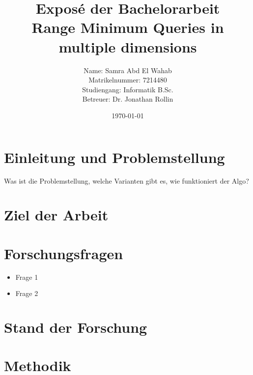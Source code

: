 \documentclass{article}
\title{%
    Exposé der Bachelorarbeit\\[1em]
    \large Range Minimum Queries in multiple dimensions
}
\author{%
    Name: Samra Abd El Wahab\\
    Matrikelnummer: 7214480\\
    Studiengang: Informatik B.Sc.\\
    Betreuer: Dr. Jonathan Rollin
}
\date{\today}
\begin{document}
\maketitle

\section{Einleitung und Problemstellung}
Was ist die Problemstellung, welche Varianten gibt es, wie funktioniert der Algo?

\section{Ziel der Arbeit}

\section{Forschungsfragen}
\begin{itemize}
    \item Frage 1
    \item Frage 2
\end{itemize}

\section{Stand der Forschung}

\section{Methodik}
\end{document}

